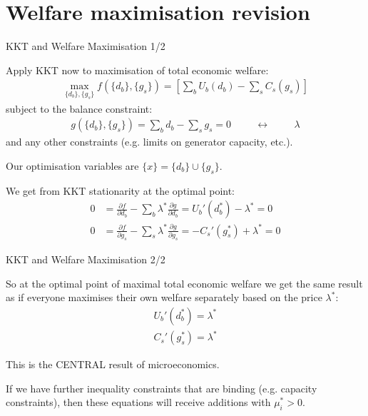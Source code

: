 \documentclass[10pt,aspectratio=169,dvipsnames]{beamer}
\def\l{\lambda}
\def\m{\mu}
\def\d{\partial}
\begin{document}
\section{Welfare maximisation revision}



\begin{frame}{KKT and Welfare Maximisation 1/2}

  Apply KKT now to maximisation of total economic welfare:
  \begin{align*}
    \max_{\{d_b\}, \{g_s\}} f(\{d_b\}, \{g_s\}) = \left[ \sum_b U_b (d_b)  -  \sum_s C_s (g_s) \right]
  \end{align*}
  subject to the balance constraint:
  \begin{align*}
    g(\{d_b\}, \{g_s\}) = \sum_b d_b -  \sum_s g_s  = 0 \hspace{1cm} \leftrightarrow \hspace{1cm} \l
  \end{align*}
  and any other constraints (e.g. limits on generator capacity, etc.).

  Our optimisation variables are $\{x\} = \{d_b\} \cup \{g_s\}$.

  We get from KKT stationarity at the optimal point:
  \begin{align*}
    0 & =   \frac{\d f}{\d d_b} - \sum_b \l^* \frac{\d g}{\d d_b} = U_b'(d_b^*) - \l^* = 0 \\
    0 & =   \frac{\d f}{\d g_s} - \sum_s \l^* \frac{\d g}{\d g_s} = -C_s'(g_s^*) + \l^* = 0
  \end{align*}


\end{frame}





\begin{frame}{KKT and Welfare Maximisation 2/2}

  So at the optimal point of maximal total economic welfare we get the
  same result as if everyone maximises their own welfare separately based on the price $\l^*$:
  \begin{align*}
 U_b'(d_b^*) =  \l^*  \\
 C_s'(g_s^*) = \l^*
  \end{align*}

  This is the CENTRAL result of microeconomics.

  If we have further inequality constraints that are binding (e.g. capacity constraints), then
  these equations will receive additions with $\m_i^* > 0$.


\end{frame}
\end{document}
